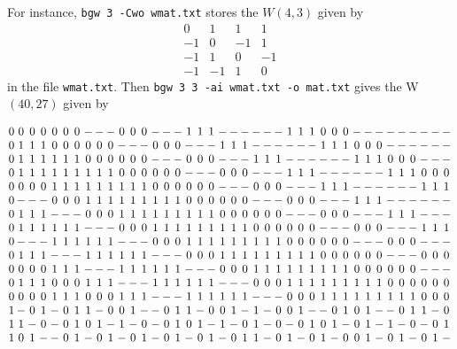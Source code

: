 \documentclass[a4paper,10pt]{article}
\begin{document}
For instance, {\tt bgw 3 -Cwo wmat.txt} stores the $W(4,3)$ given by
\[
\begin{array}{rrrr}
0 & 1 & 1 & 1 \\
-1 & 0 & -1 & 1 \\
-1 & 1 & 0 & -1 \\
-1 & -1 & 1 & 0
\end{array}
\]
in the file {\tt wmat.txt}. Then {\tt bgw 3 3 -ai wmat.txt -o mat.txt} gives the W$(40,27)$ given by
\begin{scriptsize}
\[
\arraycolsep=1.0pt\def\arraystretch{1.0}
 \begin{array}{cccccccccccccccccccccccccccccccccccccccc}
  0&0&0&0&0&0&0&-&-&-&0&0&0&-&-&-&1&1&1&-&-&-&-&-&-&1&1&1&0&0&0&-&-&-&-&-&-&-&-&-\\
0&1&1&1&0&0&0&0&0&0&-&-&-&0&0&0&-&-&-&1&1&1&-&-&-&-&-&-&1&1&1&0&0&0&-&-&-&-&-&-\\
0&1&1&1&1&1&1&0&0&0&0&0&0&-&-&-&0&0&0&-&-&-&1&1&1&-&-&-&-&-&-&1&1&1&0&0&0&-&-&-\\
0&1&1&1&1&1&1&1&1&1&0&0&0&0&0&0&-&-&-&0&0&0&-&-&-&1&1&1&-&-&-&-&-&-&1&1&1&0&0&0\\
0&0&0&0&1&1&1&1&1&1&1&1&1&0&0&0&0&0&0&-&-&-&0&0&0&-&-&-&1&1&1&-&-&-&-&-&-&1&1&1\\
0&-&-&-&0&0&0&1&1&1&1&1&1&1&1&1&0&0&0&0&0&0&-&-&-&0&0&0&-&-&-&1&1&1&-&-&-&-&-&-\\
0&1&1&1&-&-&-&0&0&0&1&1&1&1&1&1&1&1&1&0&0&0&0&0&0&-&-&-&0&0&0&-&-&-&1&1&1&-&-&-\\
0&1&1&1&1&1&1&-&-&-&0&0&0&1&1&1&1&1&1&1&1&1&0&0&0&0&0&0&-&-&-&0&0&0&-&-&-&1&1&1\\
0&-&-&-&1&1&1&1&1&1&-&-&-&0&0&0&1&1&1&1&1&1&1&1&1&0&0&0&0&0&0&-&-&-&0&0&0&-&-&-\\
0&1&1&1&-&-&-&1&1&1&1&1&1&-&-&-&0&0&0&1&1&1&1&1&1&1&1&1&0&0&0&0&0&0&-&-&-&0&0&0\\
0&0&0&0&1&1&1&-&-&-&1&1&1&1&1&1&-&-&-&0&0&0&1&1&1&1&1&1&1&1&1&0&0&0&0&0&0&-&-&-\\
0&1&1&1&0&0&0&1&1&1&-&-&-&1&1&1&1&1&1&-&-&-&0&0&0&1&1&1&1&1&1&1&1&1&0&0&0&0&0&0\\
0&0&0&0&1&1&1&0&0&0&1&1&1&-&-&-&1&1&1&1&1&1&-&-&-&0&0&0&1&1&1&1&1&1&1&1&1&0&0&0\\
1&-&0&1&-&0&1&1&-&0&0&1&-&-&0&1&1&-&0&0&1&-&1&-&0&0&1&-&-&0&1&0&1&-&-&0&1&1&-&0\\
1&1&-&0&-&0&1&0&1&-&1&-&0&-&0&1&0&1&-&1&-&0&1&-&0&-&0&1&0&1&-&0&1&-&1&-&0&-&0&1\\
1&0&1&-&-&0&1&-&0&1&-&0&1&-&0&1&-&0&1&-&0&1&1&-&0&1&-&0&1&-&0&0&1&-&0&1&-&0&1&-\\

\end{array}\]
\end{scriptsize}
\end{document}
